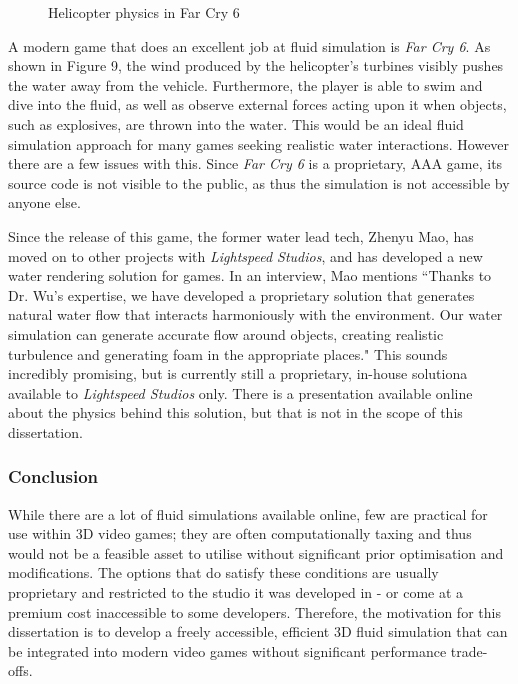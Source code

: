 \documentclass[12pt]{article}
\newcommand{\wideimage}[2][]{%
  \makebox[\textwidth][c]{\texttt{[image: \#2]}}%
}
\begin{document}
    \begin{figure}[H]
        \noindent\wideimage[]{farCry6.png}
        \caption{Helicopter physics in Far Cry 6 \cite{farcry6video}}
    \end{figure}

    A modern game that does an excellent job at fluid simulation is \textit{Far Cry 6}. As shown in Figure 9, the wind produced by the helicopter's turbines visibly pushes the water away from the vehicle. Furthermore, the player is able to swim and dive into the fluid, as well as observe external forces acting upon it when objects, such as explosives, are thrown into the water. This would be an ideal fluid simulation approach for many games seeking realistic water interactions. However there are a few issues with this. Since \textit{Far Cry 6} is a proprietary, AAA game, its source code is not visible to the public, as thus the simulation is not accessible by anyone else.
    
    Since the release of this game, the former water lead tech, Zhenyu Mao, has moved on to other projects with \textit{Lightspeed Studios}, and has developed a new water rendering solution for games. In an interview\cite{zhenyu}, Mao mentions ``Thanks to Dr. Wu's expertise, we have developed a proprietary solution that generates natural water flow that interacts harmoniously with the environment. Our water simulation can generate accurate flow around objects, creating realistic turbulence and generating foam in the appropriate places." This sounds incredibly promising, but is currently still a proprietary, in-house solutiona available to \textit{Lightspeed Studios} only. There is a presentation available online about the physics behind this solution\cite{zhenyupresent}, but that is not in the scope of this dissertation.

    \subsubsection{Conclusion}

    While there are a lot of fluid simulations available online, few are practical for use within 3D video games; they are often computationally taxing and thus would not be a feasible asset to utilise without significant prior optimisation and modifications. The options that do satisfy these conditions are usually proprietary and restricted to the studio it was developed in - or come at a premium cost inaccessible to some developers. Therefore, the motivation for this dissertation is to develop a freely accessible, efficient 3D fluid simulation that can be integrated into modern video games without significant performance trade-offs.
\end{document}
